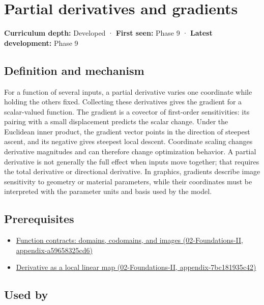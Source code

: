 \hypertarget{appendix-677b59746ae0}{}
\section{Partial derivatives and gradients}\label{appendix-677b59746ae0-partial-derivatives-and-gradients}

\textbf{Curriculum depth:} Developed · \textbf{First seen:} Phase 9 · \textbf{Latest development:} Phase 9

\subsection{Definition and mechanism}\label{appendix-677b59746ae0-definition-and-mechanism}

For a function of several inputs, a partial derivative varies one coordinate while holding the others fixed. Collecting these derivatives gives the gradient for a scalar-valued function. The gradient is a covector of first-order sensitivities: its pairing with a small displacement predicts the scalar change. Under the Euclidean inner product, the gradient vector points in the direction of steepest ascent, and its negative gives steepest local descent. Coordinate scaling changes derivative magnitudes and can therefore change optimization behavior. A partial derivative is not generally the full effect when inputs move together; that requires the total derivative or directional derivative. In graphics, gradients describe image sensitivity to geometry or material parameters, while their coordinates must be interpreted with the parameter units and basis used by the model.

\subsection{Prerequisites}\label{appendix-677b59746ae0-prerequisites}

\begin{itemize}
\tightlist
\item
  \href{../02-Foundations-II/main.pdf\#nameddest=appendix-a59658325cd6}{Function contracts: domains, codomains, and images (02-Foundations-II, appendix-a59658325cd6)}
\item
  \href{../02-Foundations-II/main.pdf\#nameddest=appendix-7bc181935c42}{Derivative as a local linear map (02-Foundations-II, appendix-7bc181935c42)}
\end{itemize}

\subsection{Used by}\label{appendix-677b59746ae0-used-by}

